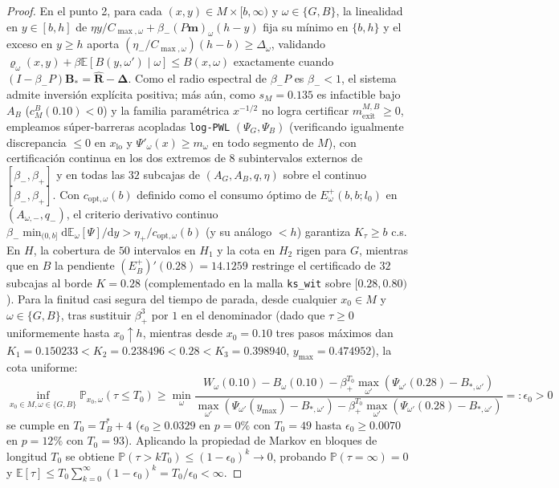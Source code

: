 \documentclass[11pt,letterpaper]{article}
\theoremstyle{plain}
\begin{document}
\begin{proof}
En el punto 2, para cada $(x,y)\in M\times[b,\infty)$ y $\omega\in\{G,B\}$, la linealidad en $y\in[b,h]$ de $\eta y/C_{\max,\omega}+\beta_-(P\mathbf{m})_\omega(h-y)$ fija su mínimo en $\{b,h\}$ y el exceso en $y\ge h$ aporta $(\eta_-/C_{\max,\omega})(h-b)\ge\Delta_\omega$, validando $\varrho_\omega(x,y)+\beta\mathbb{E}[B(y,\omega')\mid\omega]\le B(x,\omega)$ exactamente cuando $(I-\beta_- P)\mathbf{B}_* = \widehat{\mathbf{R}}-\boldsymbol{\Delta}$. Como el radio espectral de $\beta_- P$ es $\beta_-<1$, el sistema admite inversión explícita positiva; más aún, como $s_M=0.135$ es infactible bajo $A_B$ ($c_M^B(0.10)<0$) y la familia paramétrica $x^{-1/2}$ no logra certificar $m_{\mathrm{exit}}^{M,B}\ge 0$, empleamos súper-barreras acopladas \texttt{log-PWL} $(\Psi_G,\Psi_B)$ (verificando igualmente discrepancia $\le 0$ en $x_{\mathrm{lo}}$ y $\Psi'_\omega(x)\ge m_\omega$ en todo segmento de $M$), con certificación continua en los dos extremos de $8$ subintervalos externos de $[\beta_-,\beta_+]$ y en todas las $32$ subcajas de $(A_G,A_B,q,\eta)$ sobre el continuo $[\beta_-,\beta_+]$. Con $c_{\mathrm{opt},\omega}(b)$ definido como el consumo óptimo de $E^+_\omega(b,b;l_0)$ en $(A_{\omega,-},q_-)$, el criterio derivativo continuo $\beta_-\min_{(0,b]}\mathrm{d}\mathbb{E}_\omega[\Psi]/\mathrm{d}y > \eta_+/c_{\mathrm{opt},\omega}(b)$ (y su análogo $<h$) garantiza $K_\tau\ge b$ c.s. En $H$, la cobertura de $50$ intervalos en $H_1$ y la cota en $H_2$ rigen para $G$, mientras que en $B$ la pendiente $(E_B^+)'(0.28)=14.1259$ restringe el certificado de $32$ subcajas al borde $K=0.28$ (complementado en la malla \texttt{ks\_wit} sobre $[0.28,0.80)$). Para la finitud casi segura del tiempo de parada, desde cualquier $x_0\in M$ y $\omega\in\{G,B\}$, tras sustituir $\beta_+^3$ por $1$ en el denominador (dado que $\tau\ge 0$ uniformemente hasta $x_0\uparrow h$, mientras desde $x_0=0.10$ tres pasos máximos dan $K_1=0.150233<K_2=0.238496<0.28<K_3=0.398940$, $y_{\max}=0.474952$), la cota uniforme:
\[
\inf_{x_0\in M,\omega\in\{G,B\}}\mathbb{P}_{x_0,\omega}(\tau\le T_0) \ge \min_\omega \frac{W_\omega(0.10)-B_\omega(0.10)-\beta_+^{T_0}\max_{\omega'}(\Psi_{\omega'}(0.28)-B_{*,\omega'})}{\max_{\omega'}(\Psi_{\omega'}(y_{\max})-B_{*,\omega'})-\beta_+^{T_0}\max_{\omega'}(\Psi_{\omega'}(0.28)-B_{*,\omega'})} =: \epsilon_0 > 0
\]
se cumple en $T_0=T^*_B+4$ ($\epsilon_0\ge 0.0329$ en $p=0\%$ con $T_0=49$ hasta $\epsilon_0\ge 0.0070$ en $p=12\%$ con $T_0=93$). Aplicando la propiedad de Markov en bloques de longitud $T_0$ se obtiene $\mathbb{P}(\tau > k T_0)\le (1-\epsilon_0)^k\to 0$, probando $\mathbb{P}(\tau=\infty)=0$ y $\mathbb{E}[\tau]\le T_0\sum_{k=0}^\infty(1-\epsilon_0)^k = T_0/\epsilon_0 < \infty$.
\end{proof}
\end{document}
